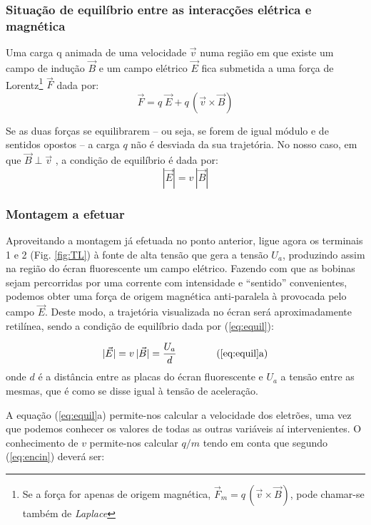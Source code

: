\documentclass[a4paper,twoside,12pt]{article}      %
\begin{document}
\subsubsection{\sf Situação de equilíbrio entre as interacções elétrica e magnética}
Uma carga q animada de uma velocidade $\vec{v}$ numa região em que existe um campo de indução $\vec{B}$ e um campo elétrico $\vec{E}$ fica submetida a uma força de Lorentz\footnote{Se a força for apenas de origem magnética, $\vec{F}_m =  q\,(\vec{v} \times \vec{B})$, pode chamar-se também de \emph{Laplace}} $\vec{F}$ dada por:
\begin{equation}
	\label{eq:Lorentz}
 \vec{F} = q\; \vec{E} + q\,(\vec{v} \times \vec{B})
\end{equation}

Se as duas forças se equilibrarem -- ou seja, se forem de igual módulo e de sentidos opostos -- a carga $q$ não é desviada da sua trajetória. No nosso caso, em que $\vec{B} \perp \vec{v}$ , a condição de equilíbrio é dada por:
\begin{equation}
	\label{eq:equil}
 |\vec{E}| = v\, |\vec{B}|
\end{equation}

\subsubsection{\sf Montagem a efetuar}

Aproveitando a montagem já efetuada no ponto anterior, ligue agora os terminais 1 e 2 (Fig. \ref{fig:TL}) à fonte de alta tensão que gera a tensão $U_a$, produzindo assim na região do écran fluorescente um campo elétrico. Fazendo com que as bobinas sejam percorridas por uma corrente com intensidade e  ``sentido'' convenientes, podemos obter uma força de origem magnética anti-paralela à provocada pelo campo $\vec{E}$. 
Deste modo, a trajetória visualizada no écran será aproximadamente retilínea, sendo a condição de equilíbrio dada por (\ref{eq:equil}):

\begin{equation*}
 |\vec{E}| = v\, |\vec{B}| = \frac{U_a}{d} \qquad  \qquad  \textrm{(\ref{eq:equil}a)}
\end{equation*}
onde $d$ é a distância entre as placas do écran fluorescente e $U_a$ a tensão entre as mesmas, que é como se disse igual à tensão de aceleração.

A equação (\ref{eq:equil}a) permite-nos calcular a velocidade dos eletrões, uma vez que podemos conhecer os valores de todas as outras variáveis aí intervenientes. O conhecimento de $v$ permite-nos calcular $q/m$ tendo em conta que segundo (\ref{eq:encin}) deverá ser:
\end{document}
